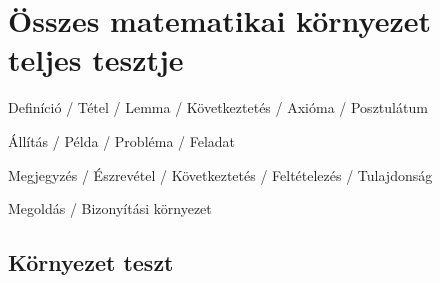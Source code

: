 \documentclass[hu]{../../elegantbook}
\begin{document}
\chapter{Összes matematikai környezet teljes tesztje}
\begin{introduction}
\item Definíció / Tétel / Lemma / Következtetés / Axióma / Posztulátum
\item Állítás / Példa / Probléma / Feladat
\item Megjegyzés / Észrevétel / Következtetés / Feltételezés / Tulajdonság
\item Megoldás / Bizonyítási környezet
\end{introduction}

\section{Környezet teszt}
\end{document}
